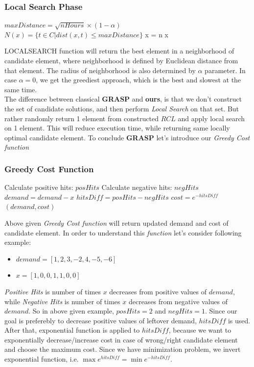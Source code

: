 \documentclass{article}
\newcommand\tab[1][1cm]{\hspace*{#1}}
\begin{document}
	\subsubsection{Local Search Phase}
	\begin{algorithmic}[1]
		\State $maxDistance = \sqrt{nHours} \times (1-\alpha)$
		\State $N(x) = \{t \in C | dist(x,t) \leq maxDistance \}$
				\State x = n
			\EndIf
		\EndFor
		\State \Return x
	\EndFunction
	\end{algorithmic}
\tab LOCALSEARCH function will return the best element in a neighborhood of candidate element, where neighborhood is defined by Euclidean distance from that element. The radius of neighborhood is also determined by $\alpha$ parameter. In case $\alpha = 0$, we get the greediest approach, which is the best and slowest at the same time.\\
\tab The difference between classical \textbf{GRASP} and \textbf{ours}, is that we don't construct the set of candidate solutions, and then perform \textit{Local Search} on that set. But rather randomly return 1 element from constructed $RCL$ and apply local search on 1 element. This will reduce execution time, while returning same locally optimal candidate element. To conclude \textbf{GRASP} let's introduce our \textit{Greedy Cost function}
	\subsubsection{Greedy Cost Function}
	\begin{algorithmic}[1]
		\State Calculate positive hits: $posHits$
		\State Calculate negative hits: $negHits$
		\State $demand = demand-x$
		\State $hitsDiff = posHits - negHits$
		\State $cost = e^{-hitsDiff}$
		\State \Return $(demand, cost)$
	\EndFunction
	\end{algorithmic}
\tab Above given \textit{Greedy Cost function} will return updated demand and cost of candidate element. In order to understand this \textit{function} let's consider following example:
	\begin{itemize}
		\item $demand = [1,2,3,-2,4,-5,-6]$
		\item $x = [1,0,0,1,1,0,0]$
	\end{itemize}
\tab \textit{Positive Hits} is number of times $x$ decreases from positive values of $demand$, while \textit{Negative Hits} is number of times $x$ decreases from negative values of $demand.$ So in above given example, $posHits = 2$ and $negHits = 1.$ Since our goal is preferebly to decrease positive values of leftover demand, $hitsDiff$ is used. After that, exponential function is applied to $hitsDiff$, because we want to exponentially decrease/increase cost in case of wrong/right candidate element and choose the maximum cost. Since we have minimization problem, we invert exponential function, i.e. $\max e^{hitsDiff} = \min e^{-hitsDiff}$. 
\end{document}
